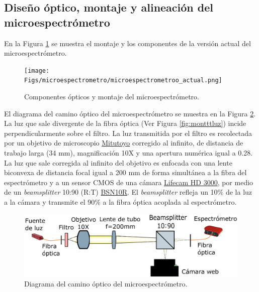 
\singlespacing
\subsection{Diseño óptico, montaje y alineación del microespectrómetro}
\label{sec:montalin}

\hspace{0.5cm}En la Figura \ref{fig:micromfinal} se muestra el montaje y los componentes de la versión actual del microespectrómetro. 
\begin{figure}[H]
	\centering
	\texttt{[image: Figs/microespectrometro/microespectrometroo\_actual.png]}
	\caption{Componentes ópticos y montaje del microespectrómetro.}
	\label{fig:micromfinal}
\end{figure}
El diagrama del camino óptico del microespectrómetro se muestra en la Figura \ref{fig:diagcaminoopt}. La luz que sale divergente de la fibra óptica (Ver Figura \ref{fig:montttluz}) incide perpendicularmente sobre el filtro. La luz transmitida por el filtro es recolectada por un objetivo de microscopio \href{https://www.edmundoptics.com/p/10x-mitutoyo-plan-apo-infinity-corrected-long-wd-objective/6623/}{Mitutoyo} corregido al infinito, de distancia de trabajo larga (34 mm), magnificación 10X y una apertura numérica igual a 0.28. La luz que sale corregida al infinito del objetivo es enfocada con una lente biconvexa de distancia focal igual a 200 mm de forma simultánea a la fibra del espectrómetro y a un sensor CMOS de una cámara \href{https://www.microsoft.com/accessories/es-xl/d/lifecam-hd-3000}{Lifecam HD 3000}, por medio de un \textit{beamsplitter} 10:90 (R:T) \href{https://www.thorlabs.com/thorproduct.cfm?partnumber=BSN10R}{BSN10R}. El \textit{beamsplitter} refleja un 10\% de la luz a la cámara y transmite el 90\% a la fibra óptica acoplada al espectrómetro. 
\begin{figure}[H]
	\centering
	\includegraphics[width=1.0\textwidth]{Figs/microespectrometro/diagopticosetup.png}
	\caption{Diagrama del camino óptico del microespectrómetro.}
	\label{fig:diagcaminoopt}
\end{figure}

